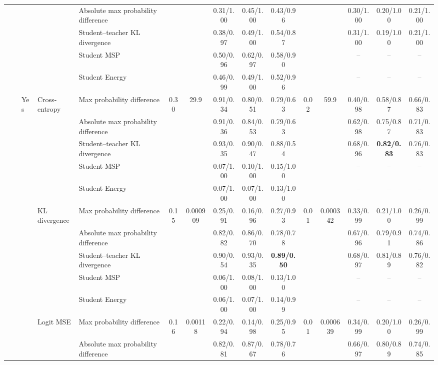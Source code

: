 \documentclass[border=2pt]{standalone}
\begin{document}
\begin{tabular}{lllllcccccccccc}
 &  &  &  & Absolute max probability difference &  &  & 0.31/1.00 & 0.45/1.00 & 0.43/0.96 &  &  & 0.30/1.00 & 0.20/1.00 & 0.21/1.00 \\
 &  &  &  & Student--teacher KL divergence &  &  & 0.38/0.97 & 0.49/1.00 & 0.54/0.87 &  &  & 0.31/1.00 & 0.19/1.00 & 0.21/1.00 \\
 &  &  &  & Student MSP &  &  & 0.50/0.96 & 0.62/0.97 & 0.58/0.90 &  &  & -- & -- & -- \\
 &  &  &  & Student Energy &  &  & 0.46/0.99 & 0.49/1.00 & 0.52/0.96 &  &  & -- & -- & -- \\
 &  & Yes & Cross-entropy & Max probability difference & 0.30 & 29.9 & 0.91/0.34 & 0.80/0.51 & 0.79/0.63 & 0.02 & 59.9 & 0.40/0.98 & 0.58/0.87 & 0.66/0.83 \\
 &  &  &  & Absolute max probability difference &  &  & 0.91/0.36 & 0.84/0.53 & 0.79/0.63 &  &  & 0.62/0.98 & 0.75/0.87 & 0.71/0.83 \\
 &  &  &  & Student--teacher KL divergence &  &  & 0.93/0.35 & 0.90/0.47 & 0.88/0.54 &  &  & 0.68/0.96 & \textbf{0.82/0.83} & 0.76/0.83 \\
 &  &  &  & Student MSP &  &  & 0.07/1.00 & 0.10/1.00 & 0.15/1.00 &  &  & -- & -- & -- \\
 &  &  &  & Student Energy &  &  & 0.07/1.00 & 0.07/1.00 & 0.13/1.00 &  &  & -- & -- & -- \\
 &  &  & KL divergence & Max probability difference & 0.15 & 0.000909 & 0.25/0.91 & 0.16/0.96 & 0.27/0.93 & 0.01 & 0.000342 & 0.33/0.99 & 0.21/1.00 & 0.26/0.99 \\
 &  &  &  & Absolute max probability difference &  &  & 0.82/0.82 & 0.86/0.70 & 0.78/0.78 &  &  & 0.67/0.96 & 0.79/0.91 & 0.74/0.86 \\
 &  &  &  & Student--teacher KL divergence &  &  & 0.90/0.54 & 0.93/0.35 & \textbf{0.89/0.50} &  &  & 0.68/0.97 & 0.81/0.89 & 0.76/0.82 \\
 &  &  &  & Student MSP &  &  & 0.06/1.00 & 0.08/1.00 & 0.13/1.00 &  &  & -- & -- & -- \\
 &  &  &  & Student Energy &  &  & 0.06/1.00 & 0.07/1.00 & 0.14/0.99 &  &  & -- & -- & -- \\
 &  &  & Logit MSE & Max probability difference & 0.16 & 0.00118 & 0.22/0.94 & 0.14/0.98 & 0.25/0.95 & 0.01 & 0.000639 & 0.34/0.99 & 0.20/1.00 & 0.26/0.99 \\
 &  &  &  & Absolute max probability difference &  &  & 0.82/0.81 & 0.87/0.67 & 0.78/0.76 &  &  & 0.66/0.97 & 0.80/0.89 & 0.74/0.85 \\

\end{tabular}
\end{document}
